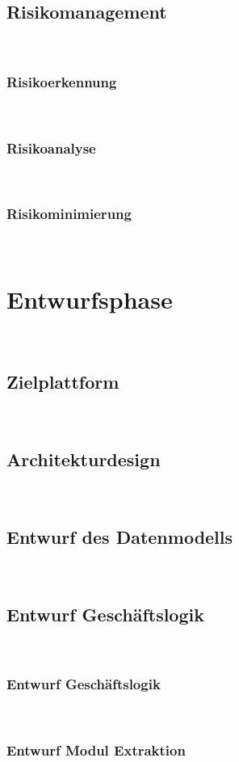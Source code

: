 \documentclass[11pt,toc=sectionentrywithoutdots, 
headheight=44pt, headings=optiontoheadandtoc, hyperfootnotes=false, hypertexnames=false]{scrartcl}
\begin{document}
\subsection{Risikomanagement}
\blindtext\

\subsubsection{Risikoerkennung}
\blindtext\

\subsubsection{Risikoanalyse}
\blindtext\

\subsubsection{Risikominimierung}
\blindtext\

\section{Entwurfsphase}
\blindtext\

\subsection{Zielplattform}
\blindtext\

\subsection{Architekturdesign}
\blindtext\

\subsection{Entwurf des Datenmodells}
\blindtext\

\subsection{Entwurf Geschäftslogik}
\blindtext\

\subsubsection{Entwurf Geschäftslogik}
\blindtext\

\subsubsection{Entwurf Modul Extraktion}
\blindtext\
\end{document}
